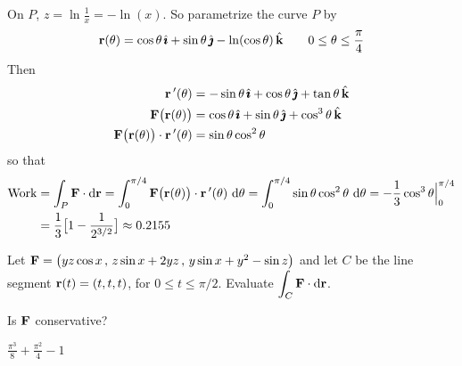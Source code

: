\begin{solution} 
On $P$, $z=\ln\frac{1}{x}=-\ln(x)$. So parametrize the curve 
$P$ by
\begin{equation*}
\mathbf{r}(\theta)=\cos\theta\,\hat{\pmb{\imath}}+\sin\theta\,\hat{\pmb{\jmath}}-\ln(\cos\theta)\,\hat{\mathbf{k}}\qquad
0\le\theta\le\frac{\pi}{4}
\end{equation*}
Then
\begin{align*}
\mathbf{r}\,'(\theta)&=-\sin\theta\,\hat{\pmb{\imath}}+\cos\theta\,\hat{\pmb{\jmath}}+\tan\theta\,\hat{\mathbf{k}}\\
\mathbf{F}\big(\mathbf{r}(\theta)\big)&=\cos\theta\,\hat{\pmb{\imath}}+\sin\theta\,\hat{\pmb{\jmath}}+\cos^3\theta\,\hat{\mathbf{k}}\\
\mathbf{F}\big(\mathbf{r}(\theta)\big)\cdot\mathbf{r}\,'(\theta)&=\sin\theta\cos^2\theta\\
\end{align*}
so that
\begin{align*}
\text{Work}
&=\int_P\mathbf{F}\cdot \mathrm{d}\mathbf{r}
=\int_0^{\pi/4}\mathbf{F}\big(\mathbf{r}(\theta)\big)\cdot\mathbf{r}\,'(\theta)\ \mathrm{d}\theta
=\int_0^{\pi/4}\sin\theta\cos^2\theta\ \mathrm{d}\theta
=-\frac{1}{3}\cos^3\theta\Big|_0^{\pi/4} \\
&=\frac{1}{3}\big[1-\frac{1}{2^{3/2}}\big]\approx 0.2155
\end{align*}
\end{solution}


\begin{question}[M317 2005A] %
Let $\mathbf{F} = \big(yz\cos x\,,\,z\sin x+2yz\,,\,y\sin x+y^2-\sin z\big)$
and let $C$ be the line segment $\mathbf{r}(t) = (t,t,t)$, for $0\le t\le\pi/2$.
Evaluate $\displaystyle\int_C\mathbf{F}\cdot\mathrm{d}\mathbf{r}$.
\end{question}

\begin{hint}
Is $\mathbf{F}$ conservative? 
\end{hint}

\begin{answer} 
$\frac{\pi^3}{8}+\frac{\pi^2}{4}-1$
\end{answer}

